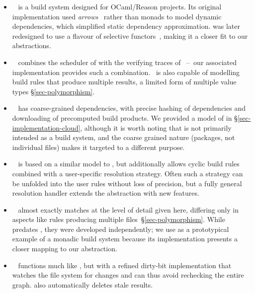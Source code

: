 \begin{itemize}
\item \Dune~\cite{dune} is a build system designed for OCaml/Reason projects.
Its original implementation used \emph{arrows}~\cite{hughes2000generalising}
rather than monads to model dynamic dependencies, which simplified static
dependency approximation. \Dune was later redesigned to use a flavour of
selective functors~\cite{mokhov_selective_2019}, making it a closer fit to our
abstractions.

\item \Ninja~\cite{ninja} combines the  scheduler of \Make with
the verifying traces of \Shake~--~our associated implementation provides such a
combination. \Ninja~is also capable of modelling build rules that produce
multiple results, a limited form of multiple value types \S\ref{sec-polymorphism}.

\item \Nix~\cite{dolstra2004nix} has coarse-grained dependencies, with precise
hashing of dependencies and downloading of precomputed build products. We
provided a model of \Nix in \S\ref{sec-implementation-cloud}, although it is
worth noting that \Nix is not primarily intended as a build system, and the
coarse grained nature (packages, not individual files) makes it targeted to a
different purpose.

\item \Pluto~\cite{erdweg2015pluto} is based on a similar model to \Shake, but
additionally allows cyclic build rules combined with a user-specific resolution
strategy. Often such a strategy can be unfolded into the user rules without loss
of precision, but a fully general resolution handler extends the 
abstraction with new features.

\item \Redo~\cite{redo-idea,grosskurth2007redo,redo} almost exactly
matches \Shake at the level of detail given here, differing only in aspects like
rules producing multiple files~\S\ref{sec-polymorphism}. While \Redo predates
\Shake, they were developed independently; we use \Shake as a prototypical
example of a monadic build system because its implementation presents a closer
mapping to our  abstraction.

\item \Tup~\cite{tup} functions much like \Make, but with a refined dirty-bit
implementation that watches the file system for changes and can thus avoid
rechecking the entire graph. \Tup also automatically deletes stale results.
\end{itemize}

